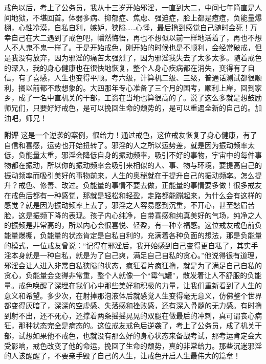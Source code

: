 \begin{case}
    戒色以后，考上了公务员，我从十三岁开始邪淫，一直到大二，中间七年简直是人间地狱，不堪回首。体弱多病、抑郁症、焦虑、强迫症，脸上都是痘痘，负能量爆棚，心性冷漠，自私自利，嫉妒，狭隘……心悸，最后撸到感觉自己随时会死！万幸自己在大二遇到了戒色吧，幡然悔悟，再也不想似以前一样地活着了，再也不想人不人鬼不鬼一样了。于是开始戒色，刚开始的时候也是不顺利，会经常破戒，但是我没有放弃，因为邪淫的痛苦太强烈了，因为邪淫我失去了太多太多。随着戒色的深入，我的身心健康也在很快地恢复，整个人身心疾病都在消失，变得有了自信，有了喜感，人生也变得平顺。考六级，计算机二级、三级，普通话测试都很顺利，搁以前都不敢想象的。大四那年专心准备了三个月的国考，顺利上岸，回到家乡，成了一名中直机关的干部，工资在当地也算很高的了。说了这么多就是想鼓励师兄们，只要好好戒色，是可以挽回生命的颓势的，是可以重遇全新的自己的。加油吧，师兄！

    \textbf{附评} 这是一个逆袭的案例，很给力！通过戒色，这位戒友恢复了身心健康，有了自信和喜感，运势也开始扭转了。邪淫的人之所以运势差，就是因为振动频率太低，负能量太重，邪淫会降低自身的振动频率，吸引不好的事物，宇宙中的每件事物都在振动，所以你的振动频率会吸引来相似的人、事、物与环境，要提高自己的振动频率而吸引美好的事物前来，人生的奥秘就在于提升自己的振动频率。怎么提升？戒色、修善、改过。负能量的事情不要去做，正能量的事情要多做！很多戒友在戒色后都有一种感觉，那就是轻松和轻盈，走路都能蹦起来，为什么会有这样的感觉？就是因为振动频率上去了，邪淫之人容易感到沉重，不开心，甚至愁眉苦脸，这是振频下降的表现。孩子内心纯净，自带喜感和纯真美好的气场，纯净之人的振频是非常高的，所以内心会很喜悦、轻盈，有一种幸福感。这位戒友戒色前负能量爆棚，负能量的状态肯定是自私自利的，充满着各种负面的想法，那是负能量的模式，一位戒友曾说：“记得在邪淫后，我开始感到自己变得更自私了，其实手淫本身就是一种自私，就是为了自己爽，满足自己自私的贪心。”他说得很有道理，邪淫会让人进入非常自私狭隘的状态，疯狂看片疯狂撸，就是为了满足自己自私的贪心，负能量会变得非常重，整个人就像一个“霉气罐”，散发着让人不舒服的负能量。戒色唤醒了深埋在我们心中那些美好和积极的力量，让我们重新看到了人生的意义和希望。多少次，在射掉那泡液体后就感觉人生变得毫无意义，仿佛整个世界都变得灰暗了，深深的空虚感、失落感和挫败感，还有深入骨髓的无力感。有时撸到射不出，还不死心，还撑着两条摇摇晃晃的双腿在做最后的冲刺，真可谓丧心病狂，那种状态完全是病态的。这位戒友戒色后逆袭了，考上了公务员，成了机关干部，试想如果他不戒色，也就没有那么好的身心状态来备战考试，那考运肯定会大受影响，戒色改变了他的命运，挽回了生命的颓势，真的非常给力。那些沉迷邪淫的人该醒醒了，不要亲手毁了自己的人生，让戒色开启人生最伟大的篇章！
\end{case}


